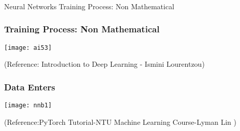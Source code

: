 \begin{frame}[fragile]\frametitle{}
\begin{center}
{\Large Neural Networks Training Process: Non Mathematical}
\end{center}
\end{frame}




\begin{frame}[fragile] \frametitle{Training Process: Non Mathematical}
\begin{center}
\texttt{[image: ai53]}
\end{center}
\tiny{(Reference: Introduction to Deep Learning - Ismini Lourentzou)}
\end{frame}




\begin{frame}[fragile] \frametitle{Data Enters }
\begin{center}
\texttt{[image: nnb1]}
\end{center}
\tiny{(Reference:PyTorch Tutorial-NTU Machine Learning Course-Lyman Lin )}
\end{frame}

